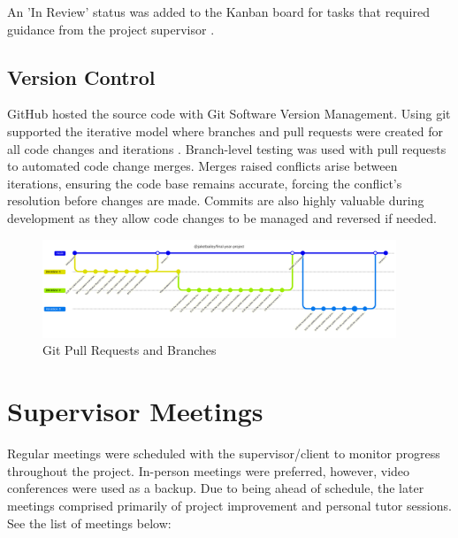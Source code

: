 An 'In Review' status was added to the Kanban board for tasks that required guidance from the project supervisor .

\subsection{Version Control}
\label{pm:version_control}

GitHub hosted the source code with Git Software Version Management. Using git supported the iterative model where branches and pull requests were created for all code changes and iterations . Branch-level testing was used with pull requests to automated code change merges. Merges raised conflicts arise between iterations, ensuring the code base remains accurate, forcing the conflict's resolution before changes are made. Commits are also highly valuable during development as they allow code changes to be managed and reversed if needed. 

\begin{figure}[!ht]
    \centering
    \includegraphics[width=400px]{figures/gitgraph.pdf}
    \caption{Git Pull Requests and Branches}
    \label{fig:gitgraph}
\end{figure}

\section{Supervisor Meetings}
\label{pm:supervisor_meetings}

Regular meetings were scheduled with the supervisor/client to monitor progress throughout the project. In-person meetings were preferred, however, video conferences were used as a backup. Due to being ahead of schedule, the later meetings comprised primarily of project improvement and personal tutor sessions. See the list of meetings below:

